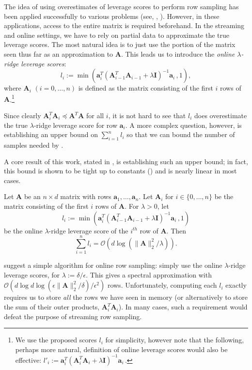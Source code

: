 \documentclass{toc}
\newcommand{\Oh}{\ensuremath{\mathcal{O}}}
\newcommand{\bv}[1]{\mathbf{#1}}
\newcommand{\norm}[1]{\|#1\|}
\begin{document}
The idea of using overestimates of leverage scores to perform row sampling has been applied successfully to various problems (see, \eg, \cite{koutis2010approaching,cohen2015uniform}).
However, in these applications, access to the entire matrix is required beforehand.
In the streaming and online settings, we have to rely on partial data to approximate the true leverage scores.
The most natural idea is to just use the portion of the matrix seen thus far as an approximation to $\bv{A}$.
This leads us to introduce the \emph{online $\lambda$-ridge leverage scores}:
$$
    l_i := \min(\bv{a}_i^T (\bv{A}_{i-1}^T \bv{A}_{i-1} + \lambda \bv{I})^{-1} \bv{a}_i\,, 1),
$$
where $\bv{A}_i$ $(i = 0,\ldots,n)$ is defined as the matrix consisting of the first $i$ rows of $\bv{A}$.\footnote{We use the proposed scores $l_i$ for simplicity, however note that the following, perhaps more natural, definition of online leverage scores would also be effective: 
$
 l'_i := \bv{a}_i^T (\bv{A}_{i}^T \bv{A}_{i} + \lambda \bv{I})^{-1} \bv{a}_i\,.
$}

Since clearly $\bv{A}_i^T\bv{A}_i \preceq \bv{A}^T\bv{A}$ for all $i$, it is not hard to see that $l_i$ does overestimate the true $\lambda$-ridge leverage score for row $\bv{a}_i$.
A more complex question, however, is establishing an upper bound on $\sum_{i=1}^n l_i$ so that we can bound the number of samples needed by .

A core result of this work, stated in , is establishing such an upper bound; in fact, this bound is shown to be tight up to constants () and is nearly linear in most cases.

\begin{theorem}
    \label{thm:online_scores}
    Let $\bv{A}$ be an $n \times d$ matrix with rows $\bv{a}_1, \ldots, \bv{a}_n$.
    Let $\bv{A}_i$ for $i \in \{0, \ldots, n\}$ be the matrix consisting of the first $i$ rows of $\bv{A}$.
For $\lambda > 0$,
let
    $$
        l_i := \min(\bv{a}_i^T (\bv{A}_{i-1}^T \bv{A}_{i-1} + \lambda \bv{I})^{-1} \bv{a}_i\,, 1)
    $$
    be the online $\lambda$-ridge leverage score of the $i^{th}$ row of $\bv{A}$.
    Then
    $$
        \sum_{i=1}^n l_i = \Oh(d \log (\norm{\bv{A}}_2^2/\lambda)).
    $$
\end{theorem}

  suggest a simple algorithm for online row sampling: simply use the online $\lambda$-ridge leverage scores, for $\lambda := \delta / \epsilon$.
This gives a spectral approximation with $\Oh(d \log d \log(\epsilon\norm{\bv{A}}_2^2/\delta)/\epsilon^2)$ rows.
Unfortunately, computing each $l_i$ exactly requires us to store \emph{all} the rows we have seen in memory (or alternatively to store the sum of their outer products, $\bv{A}_i^T\bv{A}_i$).
In many cases, such a requirement would defeat the purpose of streaming row sampling.
\end{document}
